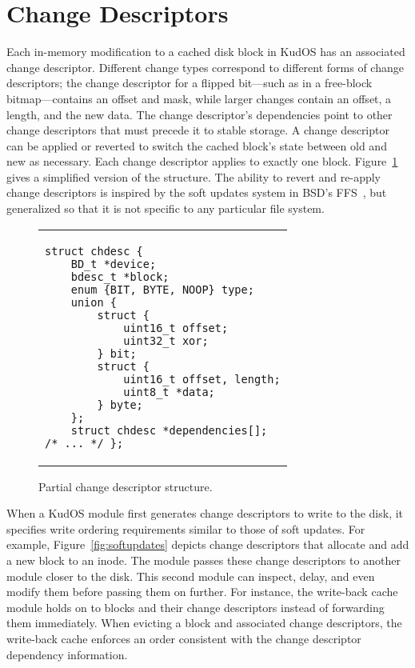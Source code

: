 \preparagraphspacing{}
\section*{Change Descriptors}
\label{sec:chdescs}

Each in-memory modification to a cached disk block in KudOS has an associated
change descriptor.
%
Different change types correspond to different forms of change descriptors;
the change descriptor for a flipped bit---such as in a free-block
bitmap---contains an offset and mask, while larger changes contain an
offset, a length, and the new data.
%
The change descriptor's dependencies point to other change descriptors that
must precede it to stable storage.
%
A change descriptor can be applied or reverted to switch the cached block's
state between old and new as necessary.
%
Each change descriptor applies to exactly one block.
%
Figure~\ref{fig:chdesc} gives
a simplified version of the structure. The ability to revert and
re-apply change descriptors is inspired by the soft updates system in
BSD's FFS~\cite{ganger00soft}, but generalized so that it is not
specific to any particular file system.

\begin{figure}
\vskip-14pt
\begin{tabular}{@{\hskip0.58in}p{2in}@{}}
\begin{scriptsize}
\begin{verbatim}
struct chdesc {
    BD_t *device;
    bdesc_t *block;
    enum {BIT, BYTE, NOOP} type;
    union {
        struct {
            uint16_t offset;
            uint32_t xor;
        } bit;
        struct {
            uint16_t offset, length;
            uint8_t *data;
        } byte;
    };
    struct chdesc *dependencies[];
/* ... */ };
\end{verbatim}
\end{scriptsize}
\end{tabular}
\vspace{-10pt}
\caption{\label{fig:chdesc} Partial change descriptor structure.}
\end{figure}

When a KudOS module first generates change descriptors to write to the disk, it
specifies write ordering requirements similar to those of soft updates. For
example, Figure~\ref{fig:softupdates} depicts change descriptors that allocate
and add a new block to an inode.
%
The module passes these change descriptors to another module closer to
the disk.  This second module can inspect, delay, and even modify them before
passing them on further.
%
For instance, the write-back cache module holds on to blocks and their change
descriptors instead of forwarding them immediately.
%
When evicting a block and associated change descriptors, the write-back
cache enforces an order consistent with the change descriptor dependency
information.

